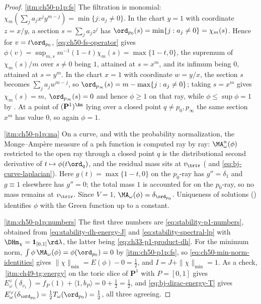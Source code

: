 \begin{proof}
\cref{itm:ch50-p1p:fs}  The filtration is monomial:
$\chi_m(\sum_ja_jx^jy^{m-j})=\min\{j:a_j\ne0\}$.  In the chart
$y=1$ with coordinate $z=x/y$, a section $s=\sum_ja_jz^j$ has
$\ord_{p_0}(s)=\min\{j:a_j\ne0\}=\chi_m(s)$.  Hence for $v=t\ord_{p_0}$,
\eqref{eq:ch50-fs-operator} gives
$\phi(v)=\sup_{m,s}m^{-1}(1-t)\chi_m(s)=\max\{1-t,0\}$, the supremum of
$\chi_m(s)/m$ over $s\ne0$ being $1$, attained at $s=x^m$, and its
infimum being $0$, attained at $s=y^m$.  In the chart $x=1$ with
coordinate $w=y/x$, the section $s$ becomes $\sum_ja_jw^{m-j}$, so
$\ord_{p_\infty}(s)=m-\max\{j:a_j\ne0\}$; taking $s=x^m$ gives
$\chi_m(s)=m$, $\ord_{p_\infty}(s)=0$ and hence $\phi\ge1$ on that
ray, while $\phi\le\sup\phi=1$ by .  At a
point of $(\mathbf P^1)^{\An}$ lying over a closed point $q\ne
p_0,p_\infty$ the same section $x^m$ has value $0$, so again
$\phi=1$.

\cref{itm:ch50-p1p:ma}  On a curve, and with the probability normalization,
the Monge--Amp\`ere measure of a psh function is computed ray by ray:
$\MA^{\mathrm u}_\omega(\phi)$ restricted to the open ray through a
closed point $q$ is the distributional second derivative of
$t\mapsto\phi(t\ord_q)$, and the residual mass sits at $v_{\triv}$
( and \eqref{eq:bj-curve-laplacian}).  Here
$g(t)=\max\{1-t,0\}$ on the $p_0$-ray has $g''=\delta_1$ and
$g\equiv1$ elsewhere has $g''=0$; the total mass $1$ is accounted for
on the $p_0$-ray, so no mass remains at $v_{\triv}$.  Since $V=1$,
$\MA_\omega(\phi)=\delta_{\ord_{p_0}}$.  Uniqueness of solutions
() identifies $\phi$ with the Green function up
to a constant.

\cref{itm:ch50-p1p:numbers}  The first three numbers are
\eqref{eq:stability-p1-numbers}, obtained from
\eqref{eq:stability-dh-energy-J} and
\eqref{eq:stability-spectral-lp} with $\DHm_\chi=\mathbf
1_{[0,1]}\rd\lambda$, the latter being \eqref{eq:ch33-p1-product-dh}.  For
the minimum norm, $\int\phi\,\MA_\omega(\phi)=\phi(\ord_{p_0})=0$ by
\cref{itm:ch50-p1p:fs}, so \eqref{eq:ch50-min-norm-identities} gives
$\|\chi\|_{\min}=E(\phi)-0=\tfrac12$, and
$I=J+\|\chi\|_{\min}=1$.  As a check,
\,\cref{itm:ch49-tg:energy} on the toric slice
of $\mathbf P^1$ with $P=[0,1]$ gives
$E^\vee_\omega(\delta_{v_1})=f_P(1)+\langle1,b_P\rangle=0+\tfrac12
=\tfrac12$, and \eqref{eq:bj-dirac-energy-T} gives
$E^\vee_\omega(\delta_{\ord_{p_0}})=\tfrac12T_\omega(\ord_{p_0})
=\tfrac12$, all three agreeing.


\end{proof}
